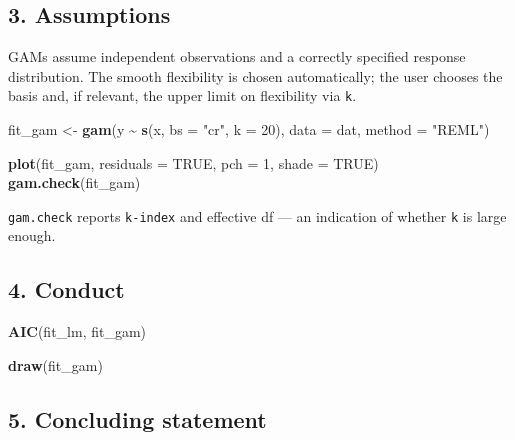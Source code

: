 \documentclass[
]{article}
\newenvironment{Shaded}{\begin{snugshade}}{\end{snugshade}}
\newcommand{\AttributeTok}[1]{\textcolor[rgb]{0.13,0.29,0.53}{#1}}
\newcommand{\ConstantTok}[1]{\textcolor[rgb]{0.56,0.35,0.01}{#1}}
\newcommand{\DecValTok}[1]{\textcolor[rgb]{0.00,0.00,0.81}{#1}}
\newcommand{\FunctionTok}[1]{\textcolor[rgb]{0.13,0.29,0.53}{\textbf{#1}}}
\newcommand{\NormalTok}[1]{#1}
\newcommand{\OtherTok}[1]{\textcolor[rgb]{0.56,0.35,0.01}{#1}}
\newcommand{\SpecialCharTok}[1]{\textcolor[rgb]{0.81,0.36,0.00}{\textbf{#1}}}
\newcommand{\StringTok}[1]{\textcolor[rgb]{0.31,0.60,0.02}{#1}}
\begin{document}
\subsection{3. Assumptions}\label{assumptions}

GAMs assume independent observations and a correctly specified response
distribution. The smooth flexibility is chosen automatically; the user
chooses the basis and, if relevant, the upper limit on flexibility via
\texttt{k}.

\begin{Shaded}
\begin{Highlighting}[]
\NormalTok{fit\_gam }\OtherTok{\textless{}{-}} \FunctionTok{gam}\NormalTok{(y }\SpecialCharTok{\textasciitilde{}} \FunctionTok{s}\NormalTok{(x, }\AttributeTok{bs =} \StringTok{"cr"}\NormalTok{, }\AttributeTok{k =} \DecValTok{20}\NormalTok{), }\AttributeTok{data =}\NormalTok{ dat, }\AttributeTok{method =} \StringTok{"REML"}\NormalTok{)}

\FunctionTok{plot}\NormalTok{(fit\_gam, }\AttributeTok{residuals =} \ConstantTok{TRUE}\NormalTok{, }\AttributeTok{pch =} \DecValTok{1}\NormalTok{, }\AttributeTok{shade =} \ConstantTok{TRUE}\NormalTok{)}
\FunctionTok{gam.check}\NormalTok{(fit\_gam)}
\end{Highlighting}
\end{Shaded}

\texttt{gam.check} reports \texttt{k-index} and effective df --- an
indication of whether \texttt{k} is large enough.

\subsection{4. Conduct}\label{conduct}

\begin{Shaded}
\begin{Highlighting}[]
\FunctionTok{AIC}\NormalTok{(fit\_lm, fit\_gam)}
\end{Highlighting}
\end{Shaded}

\begin{Shaded}
\begin{Highlighting}[]
\FunctionTok{draw}\NormalTok{(fit\_gam)}
\end{Highlighting}
\end{Shaded}

\subsection{5. Concluding statement}\label{concluding-statement}
\end{document}

